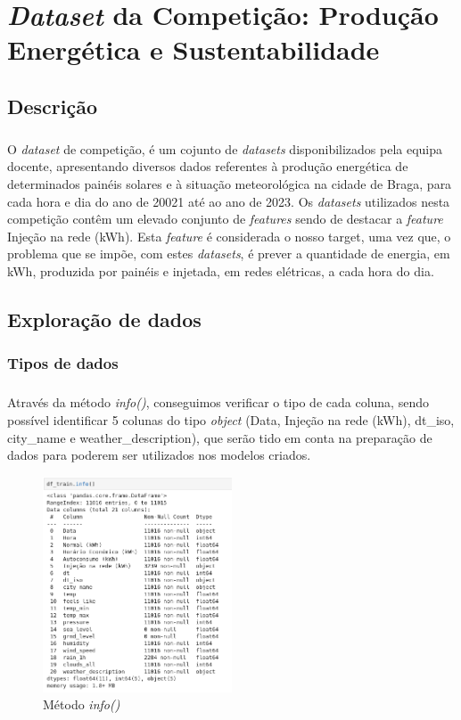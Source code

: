 \chapter{\textit{Dataset} da Competição: Produção Energética e Sustentabilidade}

\section{Descrição}
\paragraph{}
O \textit{dataset} de competição, é um cojunto de \textit{datasets} disponibilizados pela equipa docente, apresentando diversos dados referentes à produção energética de determinados painéis solares e à situação meteorológica na cidade de Braga, para cada hora e dia do ano de 20021 até ao ano de 2023.
Os \textit{datasets} utilizados nesta competição contêm um elevado conjunto de \textit{features} sendo de destacar a \textit{feature} Injeção na rede (kWh). Esta \textit{feature} é considerada o nosso target, uma vez que, o problema que se impõe, com estes \textit{datasets}, é prever a quantidade de energia, em kWh, produzida por painéis e injetada, em redes elétricas, a cada hora do dia. 

\section{Exploração de dados}

\subsection{Tipos de dados}
\paragraph{}
Através da método \textit{info()}, conseguimos verificar o tipo de cada coluna, sendo possível identificar 5 colunas do tipo \textit{object} (Data, Injeção na rede (kWh), dt\_iso, city\_name e weather\_description), que serão tido em conta na preparação de dados para poderem ser utilizados nos modelos criados.

\begin{figure}[H]
    \centering
    \centerline{\includegraphics[width=0.5\textwidth]{Imagens/Competição/info_competicao.png}}
    \caption{Método \textit{info()}}
    \label{fig: info_competicao}
\end{figure}

